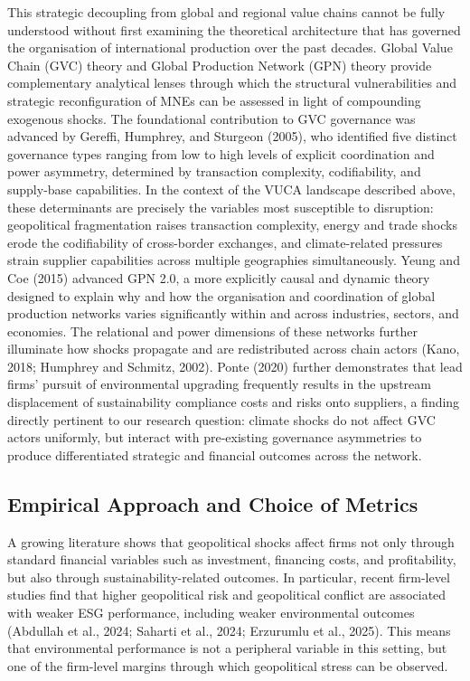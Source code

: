 \documentclass[12pt,a4paper]{article}
\begin{document}
This strategic decoupling from global and regional value chains cannot be fully understood without first examining the theoretical architecture that has governed the organisation of international production over the past decades. Global Value Chain (GVC) theory and Global Production Network (GPN) theory provide complementary analytical lenses through which the structural vulnerabilities and strategic reconfiguration of MNEs can be assessed in light of compounding exogenous shocks. The foundational contribution to GVC governance was advanced by Gereffi, Humphrey, and Sturgeon (2005), who identified five distinct governance types ranging from low to high levels of explicit coordination and power asymmetry, determined by transaction complexity, codifiability, and supply-base capabilities. In the context of the VUCA landscape described above, these determinants are precisely the variables most susceptible to disruption: geopolitical fragmentation raises transaction complexity, energy and trade shocks erode the codifiability of cross-border exchanges, and climate-related pressures strain supplier capabilities across multiple geographies simultaneously. Yeung and Coe (2015) advanced GPN 2.0, a more explicitly causal and dynamic theory designed to explain why and how the organisation and coordination of global production networks varies significantly within and across industries, sectors, and economies. The relational and power dimensions of these networks further illuminate how shocks propagate and are redistributed across chain actors (Kano, 2018; Humphrey and Schmitz, 2002). Ponte (2020) further demonstrates that lead firms' pursuit of environmental upgrading frequently results in the upstream displacement of sustainability compliance costs and risks onto suppliers, a finding directly pertinent to our research question: climate shocks do not affect GVC actors uniformly, but interact with pre-existing governance asymmetries to produce differentiated strategic and financial outcomes across the network.

\subsection{Empirical Approach and Choice of Metrics}

A growing literature shows that geopolitical shocks affect firms not only through standard financial variables such as investment, financing costs, and profitability, but also through sustainability-related outcomes. In particular, recent firm-level studies find that higher geopolitical risk and geopolitical conflict are associated with weaker ESG performance, including weaker environmental outcomes (Abdullah et al., 2024; Saharti et al., 2024; Erzurumlu et al., 2025). This means that environmental performance is not a peripheral variable in this setting, but one of the firm-level margins through which geopolitical stress can be observed.
\end{document}

